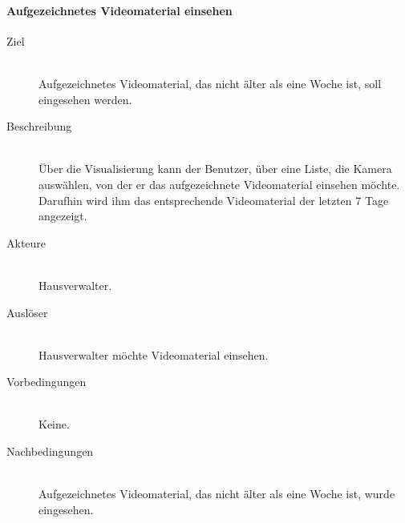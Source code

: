 \paragraph{Aufgezeichnetes Videomaterial einsehen}
    \begin{description}
        \item[Ziel]\hfill \\
        Aufgezeichnetes Videomaterial, das nicht älter als eine Woche ist, soll eingesehen werden.
        \item[Beschreibung]\hfill \\
        Über die Visualisierung kann der Benutzer, über eine Liste, die Kamera auswählen, von der er das aufgezeichnete Videomaterial einsehen möchte.
        Darufhin wird ihm das entsprechende Videomaterial der letzten 7 Tage angezeigt.
        \item[Akteure]\hfill \\
        Hausverwalter.
        \item[Auslöser]\hfill \\
        Hausverwalter möchte Videomaterial einsehen.
        \item[Vorbedingungen]\hfill \\
        Keine.
        \item[Nachbedingungen]\hfill \\
        Aufgezeichnetes Videomaterial, das nicht älter als eine Woche ist, wurde eingesehen.
        \end{description}   